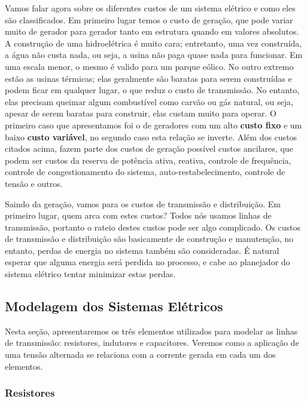 Vamos falar agora sobre os diferentes custos de um sistema elétrico e como eles são classificados. Em primeiro lugar temos o custo de geração, que pode variar muito de gerador para gerador tanto em estrutura quando em valores absolutos. A construção de uma hidroelétrica é muito cara; entretanto, uma vez construída, a água não custa nada, ou seja, a usina não paga quase nada para funcionar. Em uma escala menor, o mesmo é valido para um parque eólico. No outro extremo estão as usinas térmicas; elas geralmente são baratas para serem construídas e podem ficar em qualquer lugar, o que reduz o custo de transmissão. No entanto, elas precisam queimar algum combustível como carvão ou gás natural, ou seja, apesar de serem baratas para construir, elas custam muito para operar. O primeiro caso que apresentamos foi o de geradores com um alto \textbf{custo fixo} e um baixo \textbf{custo variável}, no segundo caso esta relação se inverte. Além dos custos citados acima, fazem parte dos custos de geração possível custos ancilares, que podem ser custos da reserva de potência ativa, reativa, controle de frequência, controle de congestionamento do sistema, auto-restabelecimento, controle de tensão e outros.

Saindo da geração, vamos para os custos de transmissão e distribuição. Em primeiro lugar, quem arca com estes custos? Todos nós usamos linhas de transmissão, portanto o rateio destes custos pode ser algo complicado. Os custos de transmissão e distribuição são basicamente de construção e manutenção, no entanto, perdas de energia no sistema também são consideradas. É natural esperar que alguma energia será perdida no processo, e cabe ao planejador do sistema elétrico tentar minimizar estas perdas. 



\subsection{Modelagem dos Sistemas Elétricos}

Nesta seção, apresentaremos os três elementos utilizados para modelar as linhas de transmissão: resistores, indutores e capacitores. Veremos como a aplicação de uma tensão alternada se relaciona com a corrente gerada em cada um dos elementos. 

\subsubsection*{Resistores}


